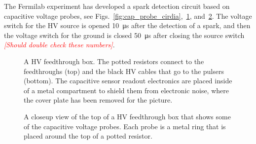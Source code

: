 The Fermilab experiment has developed a spark detection circuit based on capacitive voltage probes, see Figs.~\ref{fig:cap_probe_cirdia},~\ref{fig:hv_feedthrough_box}, and~\ref{fig:hv_feedthrough_box_top}. The voltage switch for the HV source is opened \SI{10}{\micro\second} after the detection of a spark, and then the voltage switch for the ground is closed \SI{50}{\micro\second} after closing the source switch \textcolor{red}{\textit{[Should double check these numbers]}}.

\begin{figure*}[]
	\centering
	\caption{\textcolor{orange}{Volodya} Capacitive voltage probe circuit diagram; capacitive voltage probes are used for detecting quadrupole sparks. \textcolor{red}{\textit{This is a copy from a Word document. We should try and get the original image.}}}\label{fig:cap_probe_cirdia}
\end{figure*}

\begin{figure}[]
	\centering
	\caption{A HV feedthrough box. The potted resistors connect to the feedthroughs (top) and the black HV cables that go to the pulsers (bottom). The capacitive sensor readout electronics are placed inside of a metal compartment to shield them from electronic noise, where the cover plate has been removed for the picture.}\label{fig:hv_feedthrough_box}
\end{figure}

\begin{figure}[]
	\centering
	\caption{A closeup view of the top of a HV feedthrough box that shows some of the capacitive voltage probes. Each probe is a metal ring that is placed around the top of a potted resistor.}\label{fig:hv_feedthrough_box_top}
\end{figure}

